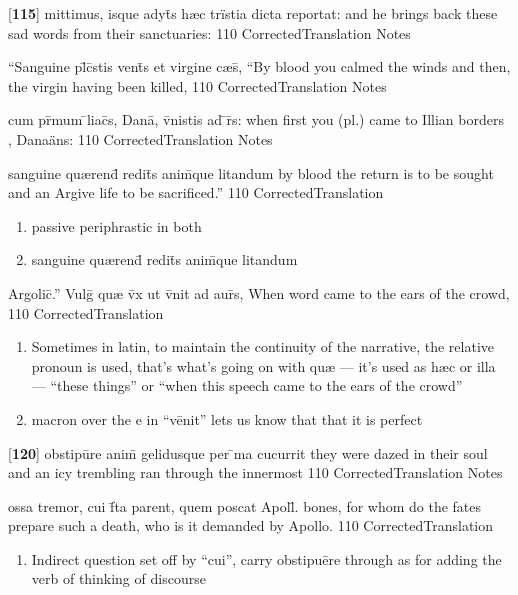 \latline
  {[\textbf{115}] mittimus, isque adyt\={\macron {\i}}s h{\ae}c tr\"{i}stia dicta reportat:}
  { and he brings back these sad words from their sanctuaries:  }
  {110}
  { CorrectedTranslation }
  { Notes }


\latline
  {``Sanguine pl\={}c\={}stis vent\={}s et virgine c{\ae}s\={},}
  { ``By blood you calmed the winds and then, the virgin having been killed, }
  {110}
  { CorrectedTranslation }
  { Notes }


\latline
  {cum pr\={\macron {\i}}mum \={}liac\={}s, Dana\={\macron {\i}}, v\={}nistis ad \={}r\={}s:}
  { when first you (pl.) came to Illian borders , Dana\"ans: }
  {110}
  { CorrectedTranslation }
  { Notes }


\latline
  {sanguine qu{\ae}rend\={\macron {\i}} redit\={}s anim\={}que litandum}
  { by blood the return is to be sought and an Argive life to be sacrificed.''  }
  {110}
  { CorrectedTranslation }
  { \begin{enumerate}
  	\item passive periphrastic in both
  	\item sanguine qu{\ae}rend\={\macron {\i}} redit\={}s anim\={}que litandum
  \end{enumerate} }


\latline
  {Argolic\={}.''  Vulg\={\macron {\i}} qu{\ae} v\={}x ut v\={}nit ad aur\={\macron {\i}}s,}
  { When word came to the ears of the crowd, }
  {110}
  { CorrectedTranslation }
  { \begin{enumerate}
  	\item Sometimes in latin, to maintain the continuity of the narrative, the
    relative pronoun is used, that's what's going on with qu{\ae} --- it's
    used as h{\ae}c or illa --- ``these things'' or ``when this speech came to
    the ears of the crowd''
  	\item macron over the e in ``v\={e}nit'' lets us know that that it is perfect
  \end{enumerate} }


\latline
  {[\textbf{120}] obstipu\={}re anim\={\macron {\i}} gelidusque per \={\macron {\i}}ma cucurrit}
  { they were dazed in their soul and an icy trembling ran through the innermost }
  {110}
  { CorrectedTranslation }
  { Notes }


\latline
  {ossa tremor, cui f\={}ta parent, quem poscat Apoll\={}.}
  { bones, for whom do the fates prepare such a death, who is it demanded by Apollo. }
  {110}
  { CorrectedTranslation }
  { \begin{enumerate}
  	\item Indirect question set off by ``cui'', carry obstipu\={e}re through as for adding the verb of thinking of discourse
  \end{enumerate} }



